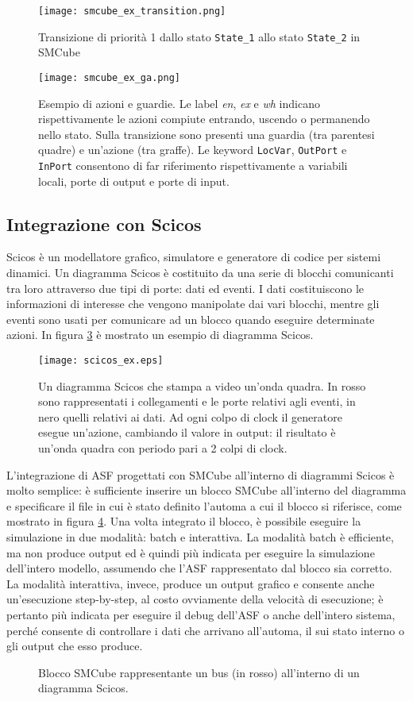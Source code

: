 \begin{figure}
\centering
\texttt{[image: smcube\_ex\_transition.png]}
\caption{Transizione di priorità 1 dallo stato \texttt{State\_1} allo stato \texttt{State\_2} in SMCube}
\label{Fig:smcube_ex_transition}
\end{figure}

\begin{figure}
\centering
\texttt{[image: smcube\_ex\_ga.png]}
\caption{Esempio di azioni e guardie. Le label \textit{en}, \textit{ex} e \textit{wh} indicano rispettivamente le azioni compiute entrando, uscendo o permanendo nello stato. Sulla transizione sono presenti una guardia (tra parentesi quadre) e un'azione (tra graffe). Le keyword \texttt{LocVar}, \texttt{OutPort} e \texttt{InPort} consentono di far riferimento rispettivamente a variabili locali, porte di output e porte di input.}
\label{Fig:smcube_ex_ga}
\end{figure}

\subsection{Integrazione con Scicos}
Scicos è un modellatore grafico, simulatore e generatore di codice per sistemi dinamici. Un diagramma Scicos è costituito da una serie di blocchi comunicanti tra loro attraverso due tipi di porte: dati ed eventi. I dati costituiscono le informazioni di interesse che vengono manipolate dai vari blocchi, mentre gli eventi sono usati per comunicare ad un blocco quando eseguire determinate azioni. In figura \ref{Fig:scicos_ex} è mostrato un esempio di diagramma Scicos.\\

\begin{figure}
\centering
\texttt{[image: scicos\_ex.eps]}
\caption{Un diagramma Scicos che stampa a video un'onda quadra. In rosso sono rappresentati i collegamenti e le porte relativi agli eventi, in nero quelli relativi ai dati. Ad ogni colpo di clock il generatore esegue un'azione, cambiando il valore in output: il risultato è un'onda quadra con periodo pari a 2 colpi di clock.}
\label{Fig:scicos_ex}
\end{figure}

L'integrazione di ASF progettati con SMCube all'interno di diagrammi Scicos è molto semplice: è sufficiente inserire un blocco SMCube all'interno del diagramma e specificare il file in cui è stato definito l'automa a cui il blocco si riferisce, come mostrato in figura \ref{Fig:smcube_scicos_ex}. Una volta integrato il blocco, è possibile eseguire la simulazione in due modalità: batch e interattiva. La modalità batch è efficiente, ma non produce output ed è quindi più indicata per eseguire la simulazione dell'intero modello, assumendo che l'ASF rappresentato dal blocco sia corretto. La modalità interattiva, invece, produce un output grafico e consente anche un'esecuzione step-by-step, al costo ovviamente della velocità di esecuzione; è pertanto più indicata per eseguire il debug dell'ASF o anche dell'intero sistema, perché consente di controllare i dati che arrivano all'automa, il sui stato interno o gli output che esso produce.

\begin{figure}
\centering
{}%
\caption{Blocco SMCube rappresentante un bus (in rosso) all'interno di un diagramma Scicos.}
\label{Fig:smcube_scicos_ex}
\end{figure}